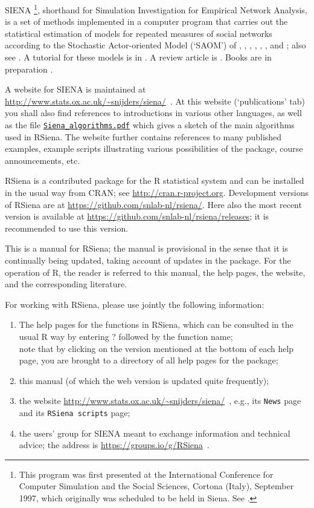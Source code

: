 \documentclass[a4paper,fleqn,11pt]{article}
\newcommand{\+}{\, + \,}
\newcommand{\sfn}[1]{\textsf{#1}}
\newcommand{\R}{{\sf R }}
\newcommand{\Rn}{{\sf R}}
\newcommand{\rs}{{\sf RSiena}}
\newcommand{\RS}{{\sf RSiena }}
\newcommand{\SI}{{\sf SIENA }}
\newcommand{\si}{{\sf SIENA}}
\begin{document}
\si
\footnote{This program was first presented at the
International Conference for Computer Simulation and the Social
Sciences, Cortona (Italy), September 1997, which originally was
scheduled to be held in Siena. See \citet{SnijdersDuijn97}.},
shorthand for {\sf Simulation Investigation for Empirical
Network Analysis}, is a set of methods
implemented in a computer program that carries out the
statistical estimation of models for repeated measures of social
networks according to the Stochastic Actor-oriented Model
 (`SAOM') of \citet{SnijdersDuijn97}, \citet{Snijders01},
\citet{SnijdersEA07},  \citet{SnijdersEA10a}, \citet{SLT2013},
\citet{Greenan15}, and \citet{KoskinenSnijders2022};
also see \citet{SteglichEA10}.
A tutorial for these models is in \citet{SnijdersEA10b}.
A review article is \citet{Snijders2017}.
Books are in preparation \citep{AMAND,SNDE}.

A website for \SI is maintained at
{\small\url{http://www.stats.ox.ac.uk/~snijders/siena/}~}.
At this website (`publications' tab)
you shall also find references to introductions in various other languages,
as well as the file
\href{http://www.stats.ox.ac.uk/~snijders/siena/Siena_algorithms.pdf}{\texttt{Siena\_algorithms.pdf}}
 which
gives a sketch of the main algorithms used in \rs.
The website further contains references to many published examples,
example scripts illustrating various possibilities of the package,
course announcements, etc.

\RS is a contributed package for the \R statistical system \citep{R}
and can be installed in the usual way from \sfn{CRAN};
see \url{http://cran.r-project.org}.
Development versions of \RS are at
\url{https://github.com/snlab-nl/rsiena/}.
Here also the most recent version is available
at \url{https://github.com/snlab-nl/rsiena/releases};
it is recommended to use this version.

This is a manual for \rs;
the manual is provisional in the sense
that it is continually being updated, taking account of
updates in the package. For the operation of \Rn,
the reader is referred to this manual, the help pages,
the website, and the corresponding literature.

For working with \rs, please use jointly the following
information:
\begin{enumerate}
  \item The help pages for the functions in \rs, which can be consulted
        in the usual \R way by entering ? followed by the function name;\\
        note that by clicking on the version mentioned at the bottom
        of each help page, you are brought to a directory of all help
        pages for the package;
  \item this manual (of which the web version is updated quite frequently);
  \item the website
{\small\url{http://www.stats.ox.ac.uk/~snijders/siena/}~},
        e.g., its \texttt{News} page and its \texttt{RSiena scripts} page;
  \item the users' group for \SI meant to exchange information
        and technical advice; the address is
        {\small\url{https://groups.io/g/RSiena}~}.
\end{enumerate}
\end{document}
